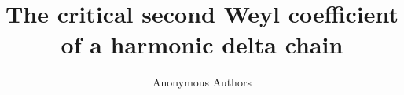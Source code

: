 \documentclass[11pt,a4paper]{article}
\title{The critical second Weyl coefficient\protect\\ of a harmonic delta chain}
\author{Anonymous Authors}
\date{}
\begin{document}
\maketitle
\begin{abstract}

\end{abstract}









\end{document}
